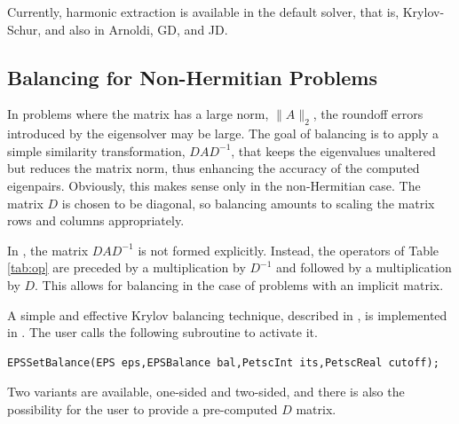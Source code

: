 Currently, harmonic extraction is available in the default  solver, that is, Krylov-Schur, and also in Arnoldi, GD, and JD.

\subsection{Balancing for Non-Hermitian Problems}
\label{sec:balancing}

In problems where the matrix has a large norm, $\|A\|_2$, the roundoff errors introduced by the eigensolver may be large. The goal of balancing is to apply a simple similarity transformation, $DAD^{-1}$, that keeps the eigenvalues unaltered but reduces the matrix norm, thus enhancing the accuracy of the computed eigenpairs. Obviously, this makes sense only in the non-Hermitian case. The matrix $D$ is chosen to be diagonal, so balancing amounts to scaling the matrix rows and columns appropriately.

In \slepc, the matrix $DAD^{-1}$ is not formed explicitly. Instead, the operators of Table \ref{tab:op} are preceded by a multiplication by $D^{-1}$ and followed by a multiplication by $D$. This allows for balancing in the case of problems with an implicit matrix.

A simple and effective Krylov balancing technique, described in \citep{Chen:2000:BSM}, is implemented in \slepc. The user calls the following subroutine to activate it.
	\begin{Verbatim}[fontsize=\small]
	EPSSetBalance(EPS eps,EPSBalance bal,PetscInt its,PetscReal cutoff);
	\end{Verbatim}
Two variants are available, one-sided and two-sided, and there is also the possibility for the user to provide a pre-computed $D$ matrix.
